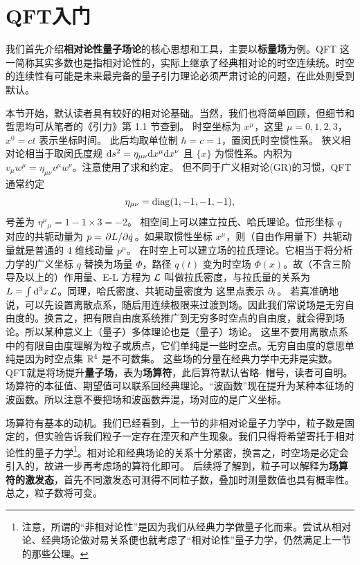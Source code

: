 \chapter{QFT入门}

我们首先介绍\textbf{相对论性量子场论}的核心思想和工具，主要以\textbf{标量场}为例。QFT 这一简称其实多数也是指相对论性的，实际上继承了经典相对论的时空连续统。时空的连续性有可能是未来最完备的量子引力理论必须严肃讨论的问题，在此处则受到默认。

本节开始，默认读者具有较好的相对论基础。当然，我们也将简单回顾，但细节和哲思均可从笔者的《引力》第 1.1 节查到。
时空坐标为 $x^\mu$，这里 $\mu=0,1,2,3$，$x^0=ct$ 表示坐标时间。
此后均取单位制 $\hbar = c = 1$，置闵氏时空惯性系。
狭义相对论相当于取闵氏度规 $\dd s^2=\eta_{\mu\nu}\dd x^\mu\dd x^\nu$ 且 $\{x\}$ 为惯性系。内积为 $v_\mu w^\mu = \eta_{\mu\nu}v^\mu w^\nu$。注意使用了求和约定。
但不同于广义相对论(GR)的习惯，QFT通常约定
\[\eta_{\mu\nu}=\operatorname{diag}(1,-1,-1,-1),\]
号差为 $\eta^\mu{}_\mu = 1 - 1 \times 3 = -2$。
相空间上可以建立拉氏、哈氏理论。位形坐标 $q$ 对应的共轭动量为 $p=\pdv*{L}{\dot q}$。如果取惯性坐标 $x^\mu$，则（自由作用量下）共轭动量就是普通的 4 维线动量 $p^\mu$。
在时空上可以建立场的拉氏理论。它相当于将分析力学的广义坐标 $q$ 替换为场量 $\Phi$，路径 $q(t)$ 变为时空场 $\Phi(x)$。故（不含三阶导及以上的）作用量、E-L 方程为
$\mathcal{L}$ 叫做拉氏密度，与拉氏量的关系为 $L=\int\dd[3]{x}\mathcal{L}$。同理，哈氏密度、共轭动量密度为
这里点表示 $\partial_t$。
若真准确地说，可以先设置离散点系，随后用连续极限来过渡到场。因此我们常说场是无穷自由度的。换言之，把有限自由度系统推广到无穷多时空点的自由度，就会得到场论。所以某种意义上（量子）多体理论也是（量子）场论。
这里不要用离散点系中的有限自由度理解为粒子或质点，它们单纯是一些时空点。无穷自由度的意思单纯是因为时空点集 $\mathbb{R}^4$ 是不可数集。
这些场的分量在经典力学中无非是实数。QFT就是将场提升\textbf{量子场}，表为\textbf{场算符}，此后算符默认省略 $\hat{}$ 帽号，读者可自明。场算符的本征值、期望值可以联系回经典理论。“波函数”现在提升为某种本征场的波函数。所以注意不要把场和波函数弄混，场对应的是广义坐标。

场算符有基本的动机。我们已经看到，上一节的非相对论量子力学中，粒子数是固定的，但实验告诉我们粒子一定存在湮灭和产生现象。我们只得将希望寄托于相对论性的量子力学\footnote{注意，所谓的“非相对论性”是因为我们从经典力学做量子化而来。尝试从相对论、经典场论做对易关系便也就考虑了“相对论性”量子力学，仍然满足上一节的那些公理。}。相对论和经典场论的关系十分紧密，换言之，时空场是必定会引入的，故进一步再考虑场的算符化即可。
后续将了解到，粒子可以解释为\textbf{场算符的激发态}，首先不同激发态可测得不同粒子数，叠加时测量数值也具有概率性。总之，粒子数将可变。

